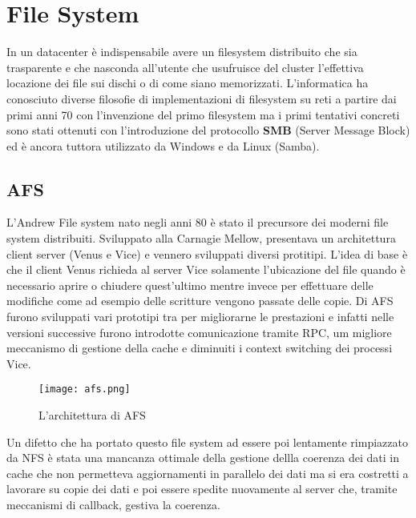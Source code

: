 \section{File System} 
In un datacenter è indispensabile avere un filesystem distribuito che sia trasparente e che nasconda all'utente che usufruisce del cluster l'effettiva locazione dei file sui dischi o di come siano memorizzati. L'informatica ha conosciuto diverse filosofie di implementazioni di filesystem su reti a partire dai primi anni 70 con l'invenzione del primo filesystem ma i primi tentativi concreti sono stati ottenuti con l'introduzione del protocollo \textbf{SMB} (Server Message Block) ed è ancora tuttora utilizzato da Windows e da Linux (Samba).
\subsection{AFS}
L'Andrew File system nato negli anni 80 è stato il precursore dei moderni file system distribuiti. Sviluppato alla Carnagie Mellow, presentava un architettura client server (Venus e Vice) e vennero sviluppati diversi protitipi. L'idea di base è che il client Venus richieda al server Vice solamente l'ubicazione del file quando è necessario aprire o chiudere quest'ultimo mentre invece per effettuare delle modifiche come ad esempio delle scritture vengono passate delle copie. Di AFS furono sviluppati vari prototipi tra per migliorarne le prestazioni e infatti nelle versioni successive furono introdotte comunicazione tramite RPC, um migliore meccanismo di gestione della cache e diminuiti i context switching dei processi Vice. \\
\begin{figure}[ht]
  \begin{center}
    \texttt{[image: afs.png]}
    \caption{L'architettura di AFS}
    \label{hyp}
  \end{center}
\end{figure}
Un difetto che ha portato questo file system ad essere poi lentamente rimpiazzato da NFS è stata una mancanza ottimale della gestione dellla coerenza dei dati in cache che non permetteva aggiornamenti in parallelo dei dati ma si era costretti a lavorare su copie dei dati e poi essere spedite nuovamente al server che, tramite meccanismi di callback, gestiva la coerenza.
